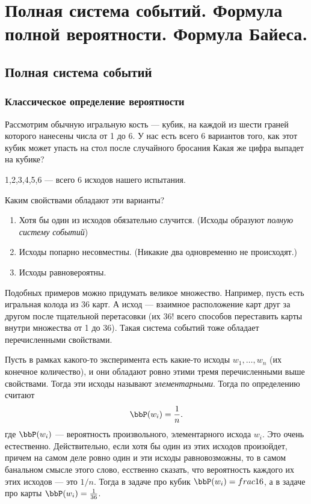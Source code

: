 \chapter{Полная система событий. Формула полной вероятности. Формула Байеса.}
\section{Полная система событий}

\subsection{Классическое определение вероятности}

Рассмотрим обычную игральную кость --- кубик, на каждой из шести граней которого нанесены числа от 1 до 6. У нас есть всего 6 вариантов того, как этот кубик может упасть на стол после случайного бросания Какая же цифра выпадет на кубике? 
\begin{center}
1,2,3,4,5,6 --- всего 6 исходов нашего испытания.
\end{center}
Каким свойствами обладают эти варианты?
\begin{enumerate}
\item Хотя бы один из исходов обязательно случится. (Исходы образуют \textit{полную систему событий})
\item Исходы попарно несовместны. (Никакие два одновременно не происходят.)
\item Исходы равновероятны.
\end{enumerate}

Подобных примеров можно придумать великое множество. Например, пусть есть игральная колода из 36 карт. А исход --- взаимное расположение карт друг за другом после тщательной перетасовки (их 36! всего способов переставить карты внутри множества от 1 до 36). Такая система событий тоже обладает перечисленными свойствами.

Пусть в рамках какого-то эксперимента есть какие-то исходы $w_1, \dots,w_n$ (их конечное количество), и они обладают ровно этими тремя перечисленными выше свойствами. Тогда эти исходы называют \textit{элементарными}. Тогда по определению считают
$$
\bbP(w_i)=\frac{1}{n}.
$$
где $\bbP(w_i)$ --- вероятность произвольного, элементарного исхода $w_i$. Это очень естественно. Действительно, если хотя бы один из этих исходов произойдет, причем на самом деле ровно один и эти исходы равновозможны, то в самом банальном смысле этого слово, есственно сказать, что вероятность каждого их этих исходов --- это $1/n$. Тогда в задаче про кубик $\bbP(w_i) =frac{1}{6}$, а в задаче про карты $\bbP(w_i) = \frac{1}{36}$.

